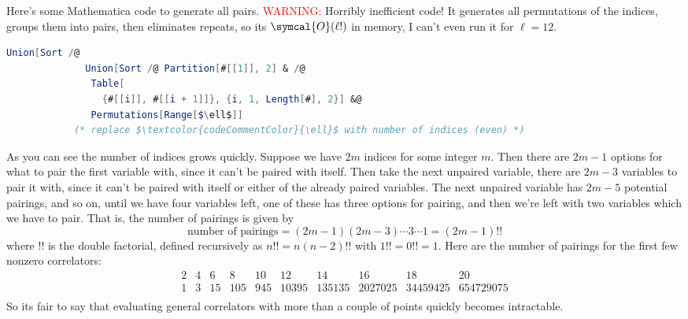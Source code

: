 \documentclass[fleqn]{NotesClass}
\newcommand{\order}{\symcal{O}}
\begin{document}
    \begin{cde}{}{}
        Here's some Mathematica code to generate all pairs.
        \textcolor{Red}{WARNING:} Horribly inefficient code!
        It generates all permutations of the indices, groups them into pairs, then eliminates repeats, so its \(\order(\ell!)\) in memory, I can't even run it for \(\ell = 12\).
        \begin{lstlisting}[gobble=12, language=mathematica, mathescape]
            Union[Sort /@ 
              Union[Sort /@ Partition[#[[1]], 2] & /@ 
               Table[
                 {#[[i]], #[[i + 1]]}, {i, 1, Length[#], 2}] &@
               Permutations[Range[$\ell$]]
            (* replace $\textcolor{codeCommentColor}{\ell}$ with number of indices (even) *)
        \end{lstlisting}
    \end{cde}
    
    As you can see the number of indices grows quickly.
    Suppose we have \(2m\) indices for some integer \(m\).
    Then there are \(2m - 1\) options for what to pair the first variable with, since it can't be paired with itself.
    Then take the next unpaired variable, there are \(2m - 3\) variables to pair it with, since it can't be paired with itself or either of the already paired variables.
    The next unpaired variable has \(2m - 5\) potential pairings, and so on, until we have four variables left, one of these has three options for pairing, and then we're left with two variables which we have to pair.
    That is, the number of pairings is given by
    \begin{equation}
        \text{number of pairings} = (2m - 1)(2m - 3) \dotsm 3 \dotsm 1 = (2m - 1)!!
    \end{equation}
    where \(!!\) is the double factorial, defined recursively as \(n!! = n(n - 2)!!\) with \(1!! = 0!! = 1\).
    Here are the number of pairings for the first few nonzero correlators:
    \begin{equation*}
        \begin{array}{rrrrrrrrrr}
            2 & 4 & 6  & 8   & 10  & 12    & 14     & 16      & 18       & 20\\
            1 & 3 & 15 & 105 & 945 & \num{10395} & \num{135135} & \num{2027025} & \num{34459425} & \num{654729075}\\
        \end{array}
    \end{equation*}
    So its fair to say that evaluating general correlators with more than a couple of points quickly becomes intractable.
\end{document}
